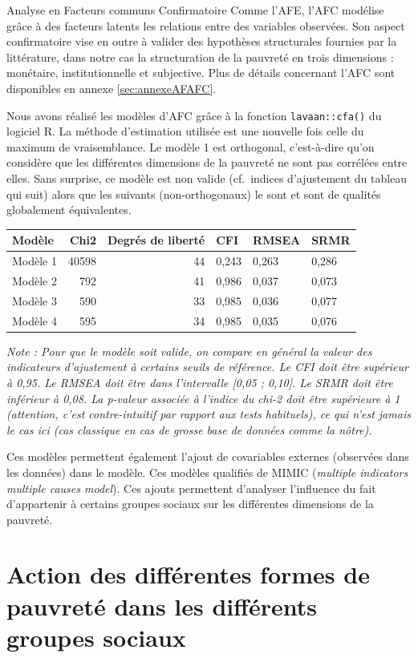 \documentclass[12pt,a4paper]{reedthesis}
\begin{document}
\begin{summary_box}[true]{Analyse en Facteurs communs Confirmatoire}
Comme l'AFE, l'AFC modélise grâce à des facteurs latents les relations entre des variables observées. Son aspect confirmatoire vise en outre à valider des hypothèses structurales fournies par la littérature, dans notre cas la structuration de la pauvreté en trois dimensions : monétaire, institutionnelle et subjective. Plus de détails concernant l'AFC sont disponibles en annexe \ref{sec:annexeAFAFC}.

Nous avons réalisé les modèles d'AFC grâce à la fonction \texttt{lavaan::cfa()} du logiciel R. La méthode d'estimation utilisée est une nouvelle fois celle du maximum de vraisemblance. Le modèle 1 est orthogonal, c'est-à-dire qu'on considère que les différentes dimensions de la pauvreté ne sont pas corrélées entre elles. Sans surprise, ce modèle est non valide (cf.~indices d'ajustement du tableau qui suit) alors que les suivants (non-orthogonaux) le sont et sont de qualités globalement équivalentes.

\medskip
\begin{tabular}{l|r|r|l|l|l}
\hline
Modèle & Chi2 & Degrés de liberté & CFI & RMSEA & SRMR\\
\hline
Modèle 1 & 40598 & 44 & 0,243 & 0,263 & 0,286\\
\hline
Modèle 2 & 792 & 41 & 0,986 & 0,037 & 0,073\\
\hline
Modèle 3 & 590 & 33 & 0,985 & 0,036 & 0,077\\
\hline
Modèle 4 & 595 & 34 & 0,985 & 0,035 & 0,076\\
\hline
\end{tabular}
\medskip

\emph{Note : Pour que le modèle soit valide, on compare en général la valeur des indicateurs d'ajustement à certains seuils de référence. Le CFI doit être supérieur à 0,95. Le RMSEA doit être dans l'intervalle {[}0,05 ; 0,10{]}. Le SRMR doit être inférieur à 0,08. La p-valeur associée à l'indice du chi-2 doit être supérieure à 1 (attention, c'est contre-intuitif par rapport aux tests habituels), ce qui n'est jamais le cas ici (cas classique en cas de grosse base de données comme la nôtre).}

Ces modèles permettent également l'ajout de covariables externes (observées dans les données) dans le modèle. Ces modèles qualifiés de MIMIC (\emph{multiple indicators multiple causes model}). Ces ajouts permettent d'analyser l'influence du fait d'appartenir à certains groupes sociaux sur les différentes dimensions de la pauvreté.

\end{summary_box}
\hypertarget{sec:esconfiinter}{%
\section{Action des différentes formes de pauvreté dans les différents groupes sociaux}\label{sec:esconfiinter}}
\end{document}
